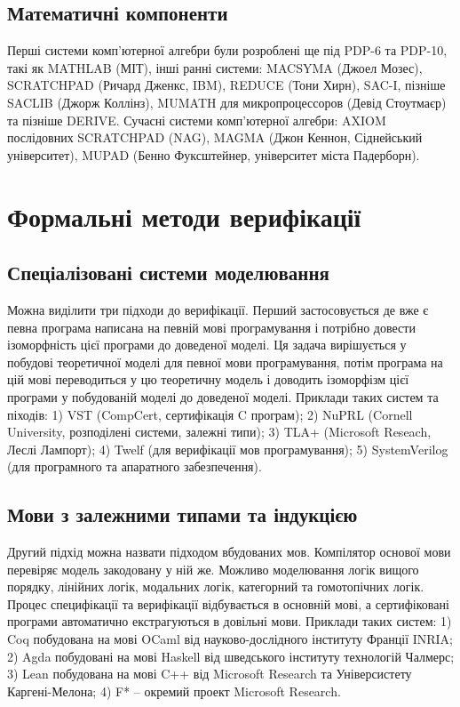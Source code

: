 \subsection{Математичні компоненти}
Перші системи комп'ютерної алгебри були розроблені ще під PDP-6 та PDP-10,
такі як MATHLAB (МІТ), інші ранні системи:
MACSYMA (Джоел Мозес),
SCRATCHPAD (Ричард Дженкс, IBM),
REDUCE (Тони Хирн),
SAC-I, пізніше SACLIB (Джорж Коллінз),
MUMATH для микропроцессоров (Девід Стоутмаєр) та пізніше DERIVE.
Сучасні системи комп'ютерної алгебри:
AXIOM послідовних SCRATCHPAD (NAG),
MAGMA (Джон Кеннон, Сіднейський університет),
MUPAD (Бенно Фуксштейнер, університет міста Падерборн).

\section{Формальні методи верифікації}

\subsection{Спеціалізовані системи моделювання}
Можна виділити три підходи до верифікації.
Перший застосовується де вже є
певна програма написана на певній мові програмування і потрібно довести ізоморфність
цієї програми до доведеної моделі. Ця задача вирішується у побудові теоретичної моделі
для певної мови програмування, потім програма на цій мові переводиться у цю
теоретичну модель і доводить ізоморфізм цієї програми у побудованій моделі до доведеної моделі.
Приклади таких систем та піходів:
1) VST (CompCert, сертифікація C програм);
2) NuPRL (Cornell University, розподілені системи, залежні типи);
3) TLA+ (Microsoft Reseach, Леслі Лампорт);
4) Twelf (для верифікації мов програмування);
5) SystemVerilog (для програмного та апаратного забезпечення).

\subsection{Мови з залежними типами та індукцією}
Другий підхід можна назвати підходом вбудованих мов.
Компілятор основої мови перевіряє модель закодовану у ній же. Можливо моделювання
логік вищого порядку, лінійних логік, модальних логік, категорний та гомотопічних логік.
Процес специфікації та верифікації відбувається в основній мові, а сертифіковані програми
автоматично екстрагуються в довільні мови.
Приклади таких систем:
1) Coq побудована на мові OCaml від науково-дослідного інституту Франції INRIA;
2) Agda побудовані на мові Haskell від шведського інституту технологій Чалмерс;
3) Lean побудована на мові C++ від Microsoft Research та Універсистету Каргені-Мелона;
4) F* -- окремий проект Microsoft Research.

